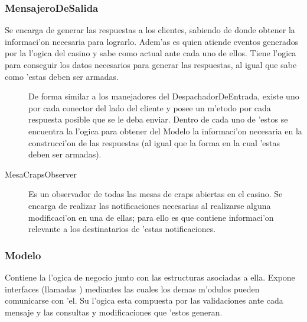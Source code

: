 \subsubsection{MensajeroDeSalida}
Se encarga de generar las respuestas a los clientes, sabiendo de donde obtener la informaci'on necesaria para lograrlo. Adem'as es quien atiende eventos generados por la l'ogica del casino y sabe como actual ante cada uno de ellos. Tiene l'ogica para conseguir los datos necesarios para generar las respuestas, al igual que sabe como 'estas deben ser armadas.


\begin{description}
\item[] De forma similar a los manejadores del DespachadorDeEntrada, existe uno por cada conector del lado del cliente y posee un m'etodo por cada respuesta posible que se le deba enviar. Dentro de cada uno de 'estos se encuentra la l'ogica para obtener del Modelo la informaci'on necesaria en la construcci'on de las respuestas (al igual que la forma en la cual 'estas deben ser armadas).
\item[MesaCrapsObserver] Es un observador de todas las mesas de craps abiertas en el casino. Se encarga de realizar las notificaciones necesarias al realizarse alguna modificaci'on en una de ellas; para ello es que contiene informaci'on relevante a los destinatarios de 'estas notificaciones.
\end{description}


\subsubsection{Modelo}
Contiene la l'ogica de negocio junto con las estructuras asociadas a ella. Expone interfaces (llamadas ) mediantes las cuales los demas m'odulos pueden comunicarse con 'el. Su l'ogica esta compuesta por las validaciones ante cada mensaje y las consultas y modificaciones que 'estos generan. 


